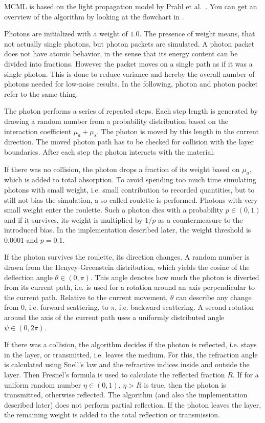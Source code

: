 \documentclass[]{article}
\begin{document}
MCML is based on the light propagation model by Prahl et al.~\cite{prahl89}. You can get an overview of the algorithm by looking at the flowchart in .

Photons are initialized with a weight of $1.0$. The presence of weight means, that not actually single photons, but photon packets are simulated. A photon packet does not have atomic behavior, in the sense that its energy content can be divided into fractions. However the packet moves on a single path as if it was a single photon. This is done to reduce variance and hereby the overall number of photons needed for low-noise results. In the following, photon and photon packet refer to the same thing.

The photon performs a series of repeated steps. Each step length is generated by drawing a random number from a probability distribution based on the interaction coefficient $\mu_a+\mu_s$. The photon is moved by this length in the current direction. The moved photon path has to be checked for collision with the layer boundaries. After each step the photon interacts with the material.

If there was no collision, the photon drops a fraction of its weight based on $\mu_a$, which is added to total absorption. To avoid spending too much time simulating photons with small weight, i.e. small contribution to recorded quantities, but to still not bias the simulation, a so-called roulette is performed. Photons with very small weight enter the roulette. Such a photon dies with a probability $p \in (0,1)$ and if it survives, its weight is multiplied by $1/p$ as a countermeasure to the introduced bias. In the implementation described later, the weight threshold is $0.0001$ and $p=0.1$.

If the photon survives the roulette, its direction changes. A random number is drawn from the Henyey-Greenstein distribution, which yields the cosine of the deflection angle $\theta \in (0, \pi)$. This angle denotes how much the photon is diverted from its current path, i.e. is used for a rotation around an axis perpendicular to the current path. Relative to the current movement, $\theta$ can describe any change from $0$, i.e. forward scattering, to $\pi$, i.e. backward scattering. A second rotation around the axis of the current path uses a uniformly distributed angle $\psi \in (0, 2\pi)$.

If there was a collision, the algorithm decides if the photon is reflected, i.e. stays in the layer, or transmitted, i.e. leaves the medium. For this, the refraction angle is calculated using Snell's law and the refractive indices inside and outside the layer. Then Fresnel's formula is used to calculate the reflected fraction $R$. If for a uniform random number $\eta \in (0,1)$, $\eta > R$ is true, then the photon is transmitted, otherwise reflected. The algorithm (and also the implementation described later) does not perform partial reflection. If the photon leaves the layer, the remaining weight is added to the total reflection or transmission.
\end{document}
